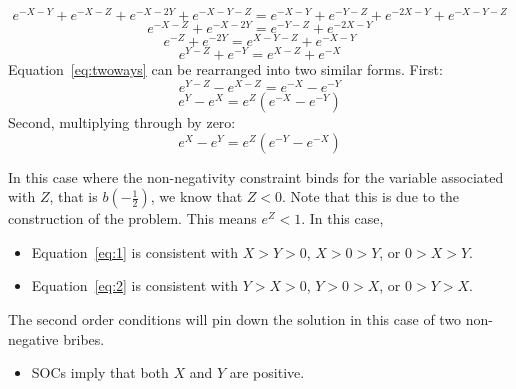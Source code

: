 \documentclass[12pt]{article}
\begin{document}
\begin{itemize}
\[		\]
		\[
		  e^{-X-Y} + e^{-X-Z} + e^{-X-2Y} +e^{-X-Y-Z}= e^{-X-Y} + e^{-Y-Z} + e^{-2X-Y} +e^{-X-Y-Z}
		\]
		\[
		  e^{-X-Z} +e^{-X-2Y}= e^{-Y-Z} +e^{-2X-Y}
		\]
		\[
		  e^{-Z} +e^{-2Y}= e^{X-Y-Z} +e^{-X-Y}
		\]
		\begin{equation}
		  e^{Y-Z} +e^{-Y}= e^{X-Z} +e^{-X}
			\label{eq:twoways}
		\end{equation}
   Equation~\ref{eq:twoways} can be rearranged into two similar forms. First:
		\[
		  e^{Y-Z} - e^{X-Z}= e^{-X} - e^{-Y}
		\]
		\begin{equation}
		  e^{Y} - e^{X}= e^Z\left(e^{-X} - e^{-Y}\right)
			\label{eq:1}
		\end{equation}
  	Second, multiplying through by zero:
	  \begin{equation}
		  e^{X} - e^{Y}= e^Z\left(e^{-Y} - e^{-X}\right)
			\label{eq:2}
		\end{equation}
	\end{itemize}	
In this case where the non-negativity constraint binds for the variable associated with $Z$, that is $b\left(-\frac{1}{2}\right)$, we know that $Z < 0$. Note that this is due to the construction of the problem. This means $e^Z < 1$. In this case,
	\begin{itemize}
		\item Equation~\ref{eq:1} is consistent with $X>Y>0$, $X>0>Y$, or $0>X>Y$.
		\item Equation~\ref{eq:2} is consistent with $Y>X>0$, $Y>0>X$, or $0>Y>X$.
	\end{itemize}
The second order conditions will pin down the solution in this case of two non-negative bribes.

\begin{itemize}
	\item SOCs imply that both $X$ and $Y$ are positive.
\end{itemize}




\newpage		
\end{document}
